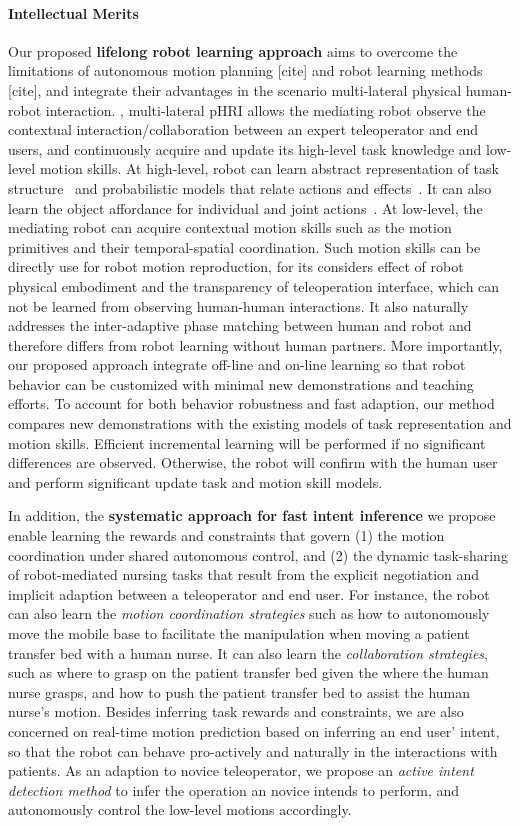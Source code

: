 \documentclass[letterpaper, 11 pt, onecolumn]{article}
\begin{document}
\paragraph*{Intellectual Merits}
Our proposed \textbf{lifelong robot learning approach} aims to overcome the limitations of autonomous motion planning [cite] and robot learning methods [cite], and integrate their advantages in the scenario multi-lateral physical human-robot interaction. , multi-lateral pHRI allows the mediating robot observe the contextual interaction/collaboration between an expert teleoperator and end users, and continuously acquire and update its high-level task knowledge and low-level motion skills. At high-level, robot can learn abstract representation of task structure~\cite{} and probabilistic models that relate actions and effects~\cite{}. It can also learn the object affordance for individual and joint actions~\cite{knoblich2011psychological}. At low-level, the mediating robot can acquire contextual motion skills such as the motion primitives and their temporal-spatial coordination. Such motion skills can be directly use for robot motion reproduction, for its considers effect of robot physical embodiment and the transparency of teleoperation interface, which can not be learned from observing human-human interactions. It also naturally addresses the inter-adaptive phase matching between human and robot and therefore differs from robot learning without human partners. More importantly, our proposed approach integrate off-line and on-line learning so that robot behavior can be customized with minimal new demonstrations and teaching efforts. To account for both behavior robustness and fast adaption, our method compares new demonstrations with the existing models of task representation and motion skills. Efficient incremental learning will be performed if no significant differences are observed. Otherwise, the robot will confirm with the human user and perform significant update task and motion skill models. 

In addition, the \textbf{systematic approach for fast intent inference} we propose enable learning the rewards and constraints that govern (1) the motion coordination under shared autonomous control, and (2) the dynamic task-sharing of robot-mediated nursing tasks that result from the explicit negotiation and implicit adaption between a teleoperator and end user. For instance, the robot can also learn the \textit{motion coordination strategies} such as how to autonomously move the mobile base to facilitate the manipulation when moving a patient transfer bed with a human nurse. It can also learn the \textit{collaboration strategies}, such as where to grasp on the patient transfer bed given the where the human nurse grasps, and how to push the patient transfer bed to assist the human nurse's motion. Besides inferring task rewards and constraints, we are also concerned on real-time motion prediction based on inferring an end user' intent, so that the robot can behave pro-actively and naturally in the interactions with patients. As an adaption to novice teleoperator, we propose an \textit{active intent detection method} to infer the operation an novice intends to perform, and autonomously control the low-level motions accordingly.  
\end{document}
